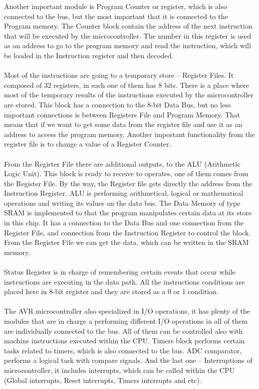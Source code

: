 \documentclass[english]{article}
\begin{document}
Another important module is Program Counter or register, which is also connected to the bus, but the most important that it is connected to the Program memory. The Counter block contain the address of the next instruction that will be executed by the microcontroller. The number in
this register is used as an address to go to the program memory and read the instruction, which will be loaded in the Instruction register and then decoded.\\\\
Most of the instructions are going to a temporary store – Register Files. It composed of 32 registers, in each one of them has 8 bits. There is a place where most of the temporary results of the instructions executed by the microcontroller are stored. This block has a connection to the 8-bit Data Bus, but no less important connections is between Registers File and Program Memory. That means that if we want to get some data from the register file and use it as an address to access the program memory. Another important functionality from the register file is to change a value of a Register Counter.\\\\
From the Register File there are additional outputs, to the ALU (Arithmetic Logic Unit). This block is ready to receive to operates, one of them comes from the Register File. By the way, the Register file gets directly the address from the Instruction Register. ALU is performing arithmetical, logical or mathematical operations and writing its values on the data bus.
The Data Memory of type SRAM is implemented to that the program manipulates certain data at its store in this chip. It has a connection to the Data Bus and one connection from the Register File, and connection from the Instruction Register to control the block. From the Register File we can get the data, which can be written in the SRAM memory.\\\\
Status Register is in charge of remembering certain events that occur while instructions are executing in the data path. All the instructions conditions are placed here in 8-bit register and they are stored as a 0 or 1 condition.\\\\
The AVR microcontroller also specialized in I/O operations, it has plenty of the modules that are in charge a performing different I/O operations in all of them are individually connected to the bus. All of them can be controlled also with machine instructions executed within the CPU.
Timers block performs certain tasks related to timers, which is also connected to the bus. ADC comparator, performs a logical task with compare signals. And the last one – Interruptions of microcontroller, it includes interrupts, which can be called within the CPU (Global interrupts, Reset interrupts, Timers interrupts and etc).
\end{document}
